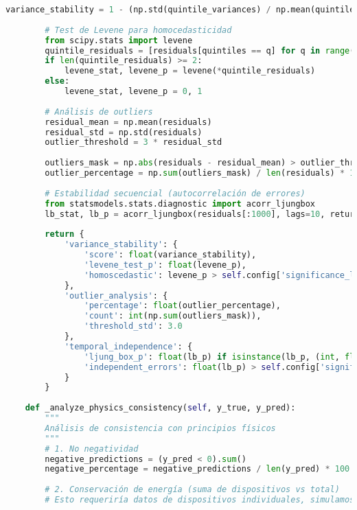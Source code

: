 \begin{lstlisting}[language=Python, caption=Framework integral de evaluación]
        variance_stability = 1 - (np.std(quintile_variances) / np.mean(quintile_variances)) if quintile_variances else 0
        
        # Test de Levene para homocedasticidad
        from scipy.stats import levene
        quintile_residuals = [residuals[quintiles == q] for q in range(5) if (quintiles == q).sum() > 1]
        if len(quintile_residuals) >= 2:
            levene_stat, levene_p = levene(*quintile_residuals)
        else:
            levene_stat, levene_p = 0, 1
        
        # Análisis de outliers
        residual_mean = np.mean(residuals)
        residual_std = np.std(residuals)
        outlier_threshold = 3 * residual_std
        
        outliers_mask = np.abs(residuals - residual_mean) > outlier_threshold
        outlier_percentage = np.sum(outliers_mask) / len(residuals) * 100
        
        # Estabilidad secuencial (autocorrelación de errores)
        from statsmodels.stats.diagnostic import acorr_ljungbox
        lb_stat, lb_p = acorr_ljungbox(residuals[:1000], lags=10, return_df=False) if len(residuals) > 100 else (0, 1)
        
        return {
            'variance_stability': {
                'score': float(variance_stability),
                'levene_test_p': float(levene_p),
                'homoscedastic': levene_p > self.config['significance_level']
            },
            'outlier_analysis': {
                'percentage': float(outlier_percentage),
                'count': int(np.sum(outliers_mask)),
                'threshold_std': 3.0
            },
            'temporal_independence': {
                'ljung_box_p': float(lb_p) if isinstance(lb_p, (int, float)) else float(lb_p.iloc[-1]),
                'independent_errors': float(lb_p) > self.config['significance_level'] if isinstance(lb_p, (int, float)) else float(lb_p.iloc[-1]) > self.config['significance_level']
            }
        }
    
    def _analyze_physics_consistency(self, y_true, y_pred):
        """
        Análisis de consistencia con principios físicos
        """
        # 1. No negatividad
        negative_predictions = (y_pred < 0).sum()
        negative_percentage = negative_predictions / len(y_pred) * 100
        
        # 2. Conservación de energía (suma de dispositivos vs total)
        # Esto requeriría datos de dispositivos individuales, simulamos con análisis de coherencia
        

\end{lstlisting}

